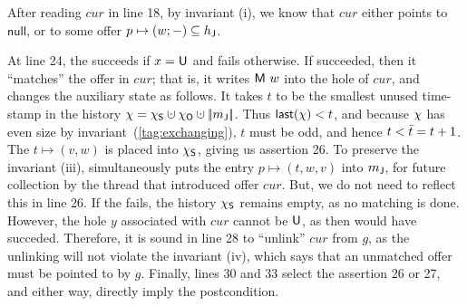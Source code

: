 
After reading $cur$ in line 18, by invariant (i), we know that $cur$
either points to $\mathsf{null}$, or to some offer $p \mapsto (w; -)
\subseteq h_{\mathsf{J}}$.


At line 24, the  succeeds if $x = {\mathsf{U}}$ and fails
otherwise. If  succeeded, then it ``matches'' the offer in $cur$;
that is, it writes ${\mathsf{M}\ w}$ into the hole of $cur$, and changes the
auxiliary state as follows. It takes $t$ to be the smallest unused
time-stamp in the history $\hist = \hists \hunion \histo \hunion
\mygather{\pending}$. Thus $\mathsf{last}(\chi) < t$, and because
$\chi$ has even size by invariant~(\ref{tag:exchanging}), $t$ must be
odd, and hence $t < \bar{t} = t+1$. The $t \mapsto (v, w)$ is placed
into $\chi_{\mathsf{S}}$, giving us assertion 26.  To preserve the invariant
(iii),  simultaneously puts the entry $p \mapsto (t, w, v)$ into
${m_{\mathsf{J}}}$, for future collection by the thread that introduced offer
$cur$. But, we do not need to reflect this in line 26.
%
If the  fails, the history $\chi_{\mathsf{S}}$ remains empty, as no matching is
done. However, the hole $y$ associated with $cur$ cannot be
${\mathsf{U}}$, as then  would have succeded.
%
Therefore, it is sound in line 28 to ``unlink'' $cur$ from $g$, as the
unlinking will not violate the invariant (iv), which says that an
unmatched offer must be pointed to by $g$.
%
Finally, lines 30 and 33 select the assertion 26 or 27, and either
way, directly imply the postcondition.



